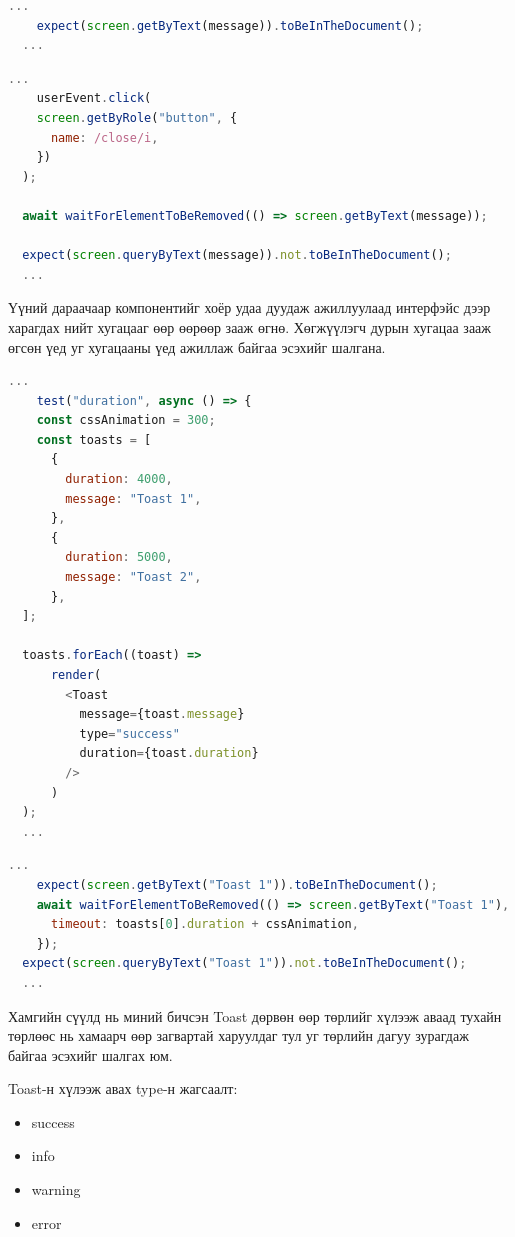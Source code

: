 \begin{lstlisting}[language=Javascript, caption=DOM дээр зурагдсан эсэхийг шалгана, frame=single]
	...  
	expect(screen.getByText(message)).toBeInTheDocument();
  ...
\end{lstlisting}

\begin{lstlisting}[language=Javascript, caption=Хаах товчлуур дээр дарахад устсан эсэхийг шалгах, frame=single]
	...  
	userEvent.click(
    screen.getByRole("button", {
      name: /close/i,
    })
  );

  await waitForElementToBeRemoved(() => screen.getByText(message));

  expect(screen.queryByText(message)).not.toBeInTheDocument();
  ...
\end{lstlisting}

Үүний дараачаар компонентийг хоёр удаа дуудаж ажиллуулаад интерфэйс дээр харагдах нийт хугацааг өөр өөрөөр зааж өгнө. Хөгжүүлэгч дурын хугацаа зааж өгсөн үед уг хугацааны үед ажиллаж байгаа эсэхийг шалгана.

\begin{lstlisting}[language=Javascript, caption=Олон Toast зэрэг гаргаж дурын хугацааг зааж өгөх, frame=single]
	...  
	test("duration", async () => {
    const cssAnimation = 300;
    const toasts = [
      {
        duration: 4000,
        message: "Toast 1",
      },
      {
        duration: 5000,
        message: "Toast 2",
      },
  ];

  toasts.forEach((toast) =>
      render(
        <Toast
          message={toast.message}
          type="success"
          duration={toast.duration}
        />
      )
  );
  ...
\end{lstlisting}

\begin{lstlisting}[language=Javascript, caption=Зааж өгсөн хугацааны дараа цэвэрлэгдэж байгаа эсэхийг шалгах, frame=single]
	...  
	expect(screen.getByText("Toast 1")).toBeInTheDocument();
    await waitForElementToBeRemoved(() => screen.getByText("Toast 1"), {
      timeout: toasts[0].duration + cssAnimation,
    });
  expect(screen.queryByText("Toast 1")).not.toBeInTheDocument();
  ...
\end{lstlisting}

Хамгийн сүүлд нь миний бичсэн Toast дөрвөн өөр төрлийг хүлээж аваад тухайн төрлөөс нь хамаарч өөр загвартай харуулдаг тул уг төрлийн дагуу зурагдаж байгаа эсэхийг шалгах юм. 

Toast-н хүлээж авах type-н жагсаалт:
\begin{itemize}
	\item success
	\item info
	\item warning
	\item error
\end{itemize}

